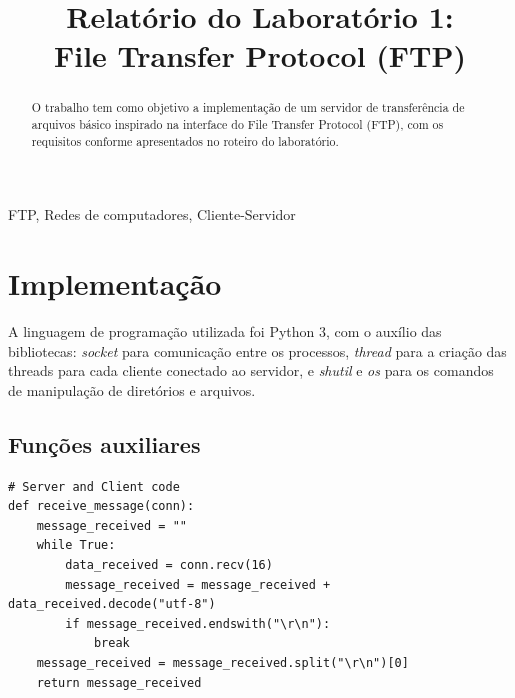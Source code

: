 \documentclass[conference]{IEEEtran}
\begin{document}
\title{Relatório do Laboratório 1: \\ File Transfer Protocol (FTP)\\
}

\author{
}

\maketitle

\begin{abstract}
O trabalho tem como objetivo a implementação de um servidor de transferência de arquivos básico inspirado na interface do File Transfer Protocol (FTP), com os requisitos conforme apresentados no roteiro do laboratório.
\end{abstract}

\begin{IEEEkeywords}
FTP, Redes de computadores, Cliente-Servidor
\end{IEEEkeywords}

\section{Implementação}

A linguagem de programação utilizada foi Python 3, com o auxílio das bibliotecas: \textit{socket} para comunicação entre os processos, \textit{thread} para a criação das threads para cada cliente conectado ao servidor, e \textit{shutil} e \textit{os} para os comandos de manipulação de diretórios e arquivos.

\subsection{Funções auxiliares}

\begin{lstlisting}
# Server and Client code
def receive_message(conn):
    message_received = ""
    while True:
        data_received = conn.recv(16)
        message_received = message_received + data_received.decode("utf-8")
        if message_received.endswith("\r\n"):
            break
    message_received = message_received.split("\r\n")[0]
    return message_received
\end{lstlisting}
\end{document}
